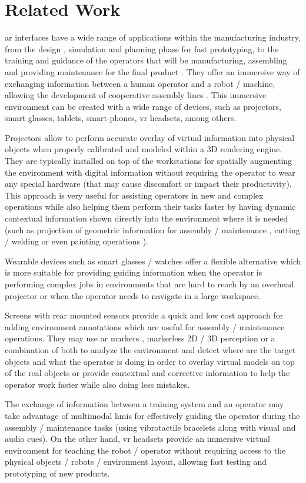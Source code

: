 \section{Related Work}\label{sec:related-work}

\gls{ar} interfaces \cite{Bimber2005} have a wide range of applications \cite{Wang2016} within the manufacturing industry, from the design \cite{Nee2012}, simulation and planning phase for fast prototyping, to the training and guidance \cite{Webel2011} of the operators that will be manufacturing, assembling and providing maintenance for the final product \cite{Zhu2014}. They offer an immersive way of exchanging information between a human operator and a robot / machine, allowing the development of cooperative assembly lines \cite{Lenz2011}. This immersive environment can be created with a wide range of devices, such as projectors, smart glasses, tablets, smart-phones, \gls{vr} headsets, among others.

Projectors allow to perform accurate overlay of virtual information into physical objects when properly calibrated \cite{Moreno2012} and modeled within a 3D rendering engine. They are typically installed on top of the workstations for spatially augmenting the environment with digital information without requiring the operator to wear any special hardware (that may cause discomfort or impact their productivity). This approach is very useful for assisting operators in new and complex operations while also helping them perform their tasks faster by having dynamic contextual information shown directly into the environment where it is needed (such as projection of geometric information for assembly / maintenance \cite{Uva2018}, cutting / welding \cite{Doshi2017} or even painting operations \cite{Barbosa2014}).

Wearable devices such as smart glasses / watches offer a flexible alternative \cite{MICHALOS2018194} which is more suitable for providing guiding information when the operator is performing complex jobs in environments that are hard to reach by an overhead projector or when the operator needs to navigate in a large workspace.

Screens with rear mounted sensors provide a quick and low cost approach for adding environment annotations which are useful for assembly / maintenance operations. They may use \gls{ar} markers \cite{Siltanen2012}, markerless 2D / 3D perception \cite{Guo2014} or a combination of both to analyze the environment and detect where are the target objects and what the operator is doing \cite{Bannat2008} in order to overlay virtual models on top of the real objects or provide contextual and corrective information to help the operator work faster while also doing less mistakes.

The exchange of information between a training system and an operator may take advantage of multimodal \glspl{hmi} \cite{Webel2013} for effectively guiding the operator during the assembly / maintenance tasks (using vibrotactile bracelets along with visual and audio cues). On the other hand, \gls{vr} headsets provide an immersive virtual environment for teaching the robot / operator \cite{ABATE2009318} without requiring access to the physical objects / robots / environment layout, allowing fast testing and prototyping of new products.
